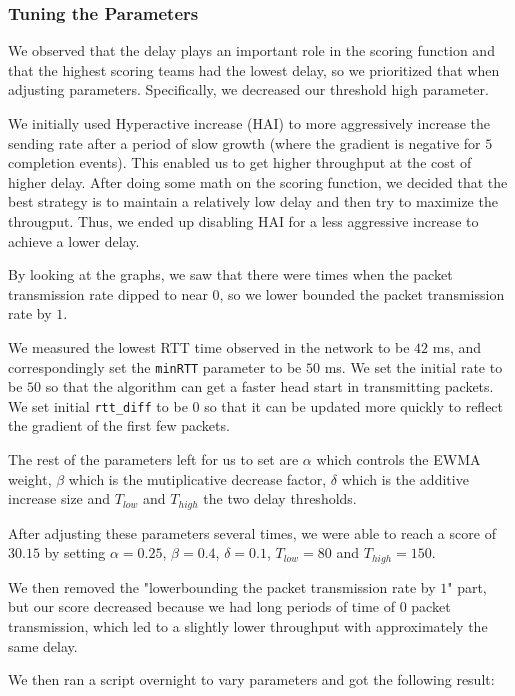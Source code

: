 \documentclass[11pt,a4paper]{article}
\begin{document}
\subsubsection{Tuning the Parameters}

We observed that the delay plays an important role in the scoring function and
that the highest scoring teams had the lowest delay, so we
prioritized that when adjusting parameters. Specifically, we decreased our
threshold high parameter.

We initially used Hyperactive increase (HAI) to more aggressively increase the sending
rate after a period of slow growth (where the gradient is negative for $5$
completion events). This enabled us to get higher throughput at the cost of
higher delay. After doing some math on the scoring function, we decided that the
best strategy is to maintain a relatively low delay and then try to maximize the
througput. Thus, we ended up disabling HAI for a less aggressive increase to
achieve a lower delay. 

By looking at the graphs, we saw that there were times when the packet transmission rate dipped to near $0$, so we lower
bounded the packet transmission rate by $1$.

We measured the lowest RTT time observed in the network to be $42$ ms, and
correspondingly set the
\texttt{minRTT} parameter to be $50$ ms. We set the initial rate to be $50$ so
that the algorithm can get a faster head start in transmitting packets. We set
initial \texttt{rtt\_diff} to be $0$ so that it can be updated more quickly to
reflect the gradient of the first few packets.

The rest of the parameters left for us to set are $\alpha$ which controls the
EWMA weight, $\beta$ which is the mutiplicative decrease factor, $\delta$ which
is the additive increase size and $T_{low}$ and $T_{high}$ the two delay
thresholds.

After adjusting these parameters several times, we were able to reach a score of
$30.15$ by setting $\alpha=0.25$, $\beta=0.4$, $\delta=0.1$, $T_{low}=80$ and
$T_{high}=150$.

We then removed the "lowerbounding the packet transmission rate by $1$" part, but
our score decreased because we had long periods of time of $0$ packet
transmission, which led to a slightly lower throughput with approximately the
same delay. 

We then ran a script overnight to vary parameters and got the following result:


%
%


\end{document}
